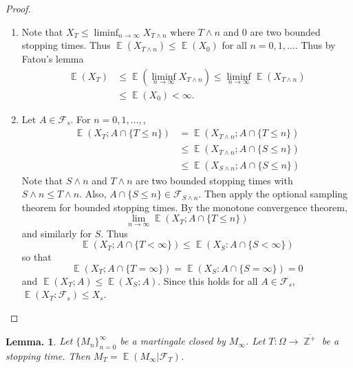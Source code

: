 \documentclass[11pt, a4paper]{memoir}
\DeclareMathOperator{\Z}{{\mathbb{Z}}}
\theoremstyle{change}
\newtheorem{lemma}[theorem]{Lemma.}
\theoremstyle{plain}
\theoremstyle{nonumberplain}
\newtheorem{proof}{Proof}
\DeclareMathOperator{\E}{{\mathbb{E}}}
\numberwithin{equation}{section}
\begin{document}
\begin{proof}
    \begin{enumerate}[nl]
        \item Note that $X_T\leq\liminf_{n\to\infty}X_{T\wedge n}$ where $T\wedge n$ and $0$ are two bounded stopping times.
            Thus $\E(X_{T\wedge n})\leq\E(X_0)$ for all $n=0,1,\ldots$.
            Thus by Fatou's lemma
            \begin{align*}
                \E(X_T)&\leq\E(\liminf_{n\to\infty} X_{T\wedge n})\leq\liminf_{n\to\infty}\E(X_{T\wedge n})\\
                       &\leq\E(X_0)<\infty.
            \end{align*}
        \item Let $A\in\mathcal{F}_s$.
            For $n=0,1,\ldots,$,
            \begin{align*}
                \E(X_T;A\cap\{T\leq n\}) &= \E(X_{T\wedge n};A\cap\{T\leq n\})\\
                                         &\leq \E(X_{T\wedge n};A\cap\{S\leq n\})\\
                                         &\leq \E(X_{S\wedge n}; A\cap\{S\leq n\})
            \end{align*}
            Note that $S\wedge n$ and $T\wedge n$ are two bounded stopping times with $S\wedge n\leq T\wedge n$.
            Also, $A\cap\{S\leq n\}\in\mathcal{F}_{S\wedge n}$.
            Then apply the optional sampling theorem for bounded stopping times.
            By the monotone convergence theorem,
            \begin{equation*}
                \lim_{n\to\infty}\E(X_T;A\cap\{T\leq n\})
            \end{equation*}
            and similarly for $S$.
            Thus
            \begin{equation*}
                \E(X_T;A\cap\{T<\infty\})\leq\E(X_S:A\cap\{S<\infty\})
            \end{equation*}
            so that
            \begin{equation*}
                \E(X_T;A\cap\{T=\infty\})=\E(X_S:A\cap\{S=\infty\})=0
            \end{equation*}
            and $\E(X_T;A)\leq\E(X_S;A)$.
            Since this holds for all $A\in\mathcal{F}_s$, $\E(X_T:\mathcal{F}_s)\leq X_s$.
    \end{enumerate}
\end{proof}
\begin{lemma}
    Let $\{M_n\}_{n=0}^\infty$ be a martingale closed by $M_\infty$.
    Let $T:\Omega\to\overline{\Z^+}$ be a stopping time.
    Then $M_T=\E(M_\infty|\mathcal{F}_T)$.
\end{lemma}
\end{document}
